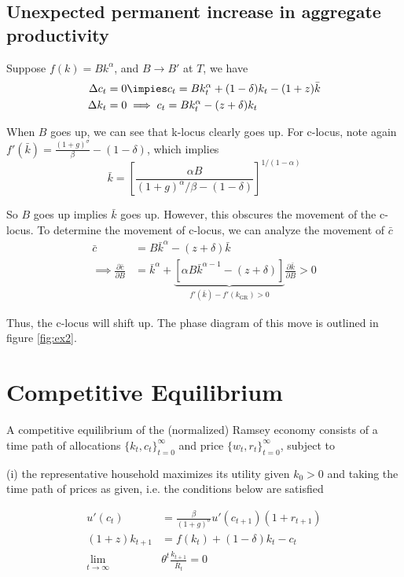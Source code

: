 \documentclass[twocolumn, fleqn]{article}
\begin{document}
		\subsection{Unexpected permanent increase in aggregate productivity}
			Suppose $f(k) = Bk^\alpha$, and $B \rightarrow B'$ at $T$, we have
			\begin{align*}
				\Delta c_t &= 0 \impies c_t = Bk_t^\alpha + (1-\delta)k_t - (1+z)\bar{k}\\
				\Delta k_t &= 0 \implies c_t = Bk_t^\alpha - (z+\delta)k_t
			\end{align*}

			When $B$ goes up, we can see that k-locus clearly goes up.
			For c-locus, note again $f'(\bar k)=\frac{(1+g)^\sigma}{\beta} - (1-\delta)$, which implies
			\[\bar{k} = \left[ \frac{\alpha B}{(1+g)^\alpha/\beta - (1-\delta)} \right]^{1/(1-\alpha)}\]

			So $B$ goes up implies $\bar{k}$ goes up.
			However, this obscures the movement of the c-locus.
			To determine the movement of c-locus, we can analyze the movement of $\bar c$
			\begin{align*}
				\bar{c} &= B \bar{k}^{\alpha} - (z+\delta)\bar{k}\\
				\implies \frac{\partial \bar c}{\partial B}&= \bar{k}^{\alpha} + \underbrace{[\alpha B \bar{k}^{\alpha
				-1}-(z+\delta)]}_{f'(\bar{k})-f'(k_{\text{GR}})>0} \frac{\partial \bar{k}}{\partial B}>0
			\end{align*}

			Thus, the c-locus will shift up.
			The phase diagram of this move is outlined in figure \eqref{fig:ex2}.

	\section{Competitive Equilibrium}\label{sec:competitive-equilibrium}
		A competitive equilibrium of the (normalized) Ramsey economy consists of a time path of allocations
		$\{k_t, c_t\}_{t=0}^{\infty}$ and price $\{w_t, r_t\}_{t=0}^{\infty}$, subject to

		(i) the representative household maximizes its utility given $k_0>0$ and taking the time path of prices as
		given, i.e. the conditions below are satisfied

		\begin{align*}
			u'(c_t) &= \frac{\beta}{(1+g)^\sigma}u'(c_{t+1})(1+r_{t+1})\\
			(1+z)k_{t+1} &= f(k_t) + (1-\delta)k_t - c_t \\
			\lim_{t\rightarrow \infty} &\theta^t \frac{k_{t+1}}{\bar{R}_t}=0
		\end{align*}
\end{document}
